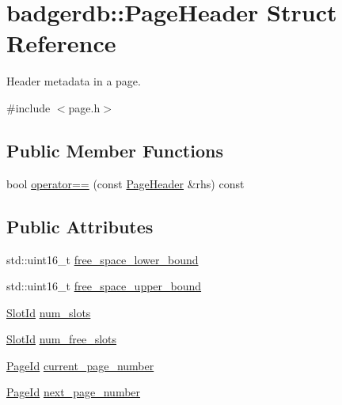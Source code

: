 \hypertarget{structbadgerdb_1_1PageHeader}{\section{badgerdb\-:\-:Page\-Header Struct Reference}
\label{structbadgerdb_1_1PageHeader}
}


Header metadata in a page.  




{\ttfamily \#include $<$page.\-h$>$}

\subsection*{Public Member Functions}
\begin{DoxyCompactItemize}
\item 
bool \hyperlink{structbadgerdb_1_1PageHeader_ab5ecd22f86e37705cd7f29bc57255586}{operator==} (const \hyperlink{structbadgerdb_1_1PageHeader}{Page\-Header} \&rhs) const 
\end{DoxyCompactItemize}
\subsection*{Public Attributes}
\begin{DoxyCompactItemize}
\item 
std\-::uint16\-\_\-t \hyperlink{structbadgerdb_1_1PageHeader_ac71c5a9b3b8644da0ea827f5bd4c5742}{free\-\_\-space\-\_\-lower\-\_\-bound}
\item 
std\-::uint16\-\_\-t \hyperlink{structbadgerdb_1_1PageHeader_a3af3c066d7651294fb3aae104f404648}{free\-\_\-space\-\_\-upper\-\_\-bound}
\item 
\hyperlink{namespacebadgerdb_afe9f2f985e7c67e04f76a16f7c4500c8}{Slot\-Id} \hyperlink{structbadgerdb_1_1PageHeader_a6c233369c611cfb617ba676e11a9d87d}{num\-\_\-slots}
\item 
\hyperlink{namespacebadgerdb_afe9f2f985e7c67e04f76a16f7c4500c8}{Slot\-Id} \hyperlink{structbadgerdb_1_1PageHeader_a7afd8d3c6f22b25e24958ebef773175e}{num\-\_\-free\-\_\-slots}
\item 
\hyperlink{namespacebadgerdb_a1f49e404293bf4240756b89b53b1587a}{Page\-Id} \hyperlink{structbadgerdb_1_1PageHeader_a3f721c5ce9ef491fdc9d12292f2f4498}{current\-\_\-page\-\_\-number}
\item 
\hyperlink{namespacebadgerdb_a1f49e404293bf4240756b89b53b1587a}{Page\-Id} \hyperlink{structbadgerdb_1_1PageHeader_a7cb8260dedb0748d3d75c4b1722dcf3c}{next\-\_\-page\-\_\-number}
\end{DoxyCompactItemize}


